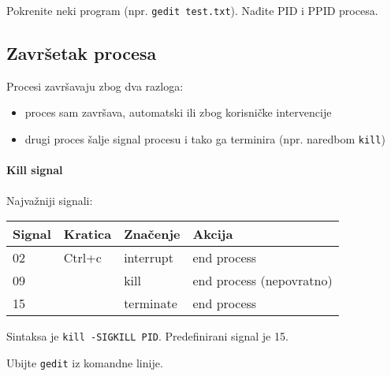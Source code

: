 \begin{zadatak} Pokrenite neki program (npr. \texttt{gedit test.txt}). Nađite PID i PPID procesa.
\end{zadatak}

\subsection*{Završetak procesa}
Procesi završavaju zbog dva razloga:
\begin{itemize}
 \item proces sam završava, automatski ili zbog korisničke intervencije
 \item drugi proces šalje signal procesu i tako ga terminira (npr. naredbom \texttt{kill})
\end{itemize}

\paragraph{Kill signal}
Najvažniji signali:
\begin{center}
\begin{tabularx}{0.7\textwidth}{lllX}
 \hline Signal & Kratica & Značenje & Akcija\\
 \hline 02 & Ctrl+c & interrupt & end process\\
 09 && kill & end process (nepovratno)\\
15&& terminate & end process\\
\hline
\end{tabularx}
\end{center}

Sintaksa je \texttt{kill -SIGKILL PID}.
Predefinirani signal je 15. 

\begin{zadatak} Ubijte \texttt{gedit} iz komandne linije.
\end{zadatak}

